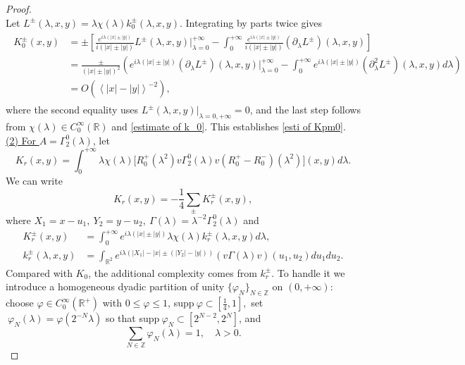 \documentclass[10pt,a4paper]{amsart}
\newcommand\R{\mathbb{R}}
\newcommand\Z{\mathbb{Z}}
\begin{document}
\begin{proof}
\begin{equation}
\end{equation} 
Let $L^{\pm}(\lambda,x,y)=\lambda \chi(\lambda)k^{\pm}_0(\lambda,x,y)$. Integrating by parts twice gives
\begin{align}\label{inte parts twice of Kpm0}
\begin{split}
K^{\pm}_{0}(x,y)&=\pm\left[\frac{e^{i\lambda(|x|\pm |y|)}}{i(|x|\pm |y|)}L^{\pm}(\lambda,x,y)\Big|^{+\infty}_{\lambda=0}-\int_{0}^{+\infty}\frac{e^{i\lambda(|x|\pm |y|)}}{i(|x|\pm |y|)}(\partial_{\lambda}L^{\pm})(\lambda,x,y)\right]\\
&=\frac{\pm}{(|x|\pm |y|)^2}\left(e^{i\lambda(|x|\pm |y|)}(\partial_{\lambda}L^{\pm})(\lambda,x,y)\Big|^{+\infty}_{\lambda=0}-\int_{0}^{+\infty}e^{i\lambda(|x|\pm |y|)}(\partial^2_{\lambda}L^{\pm})(\lambda,x,y
)d\lambda\right)\\
&=O(\left<|x|-|y|\right>^{-2}),
\end{split}
\end{align}
where the second equality uses $L^{\pm}(\lambda,x,y)\big|_{\lambda=0,+\infty}=0$, and the last step follows from $\chi(\lambda)\in C^{\infty}_0(\R)$ and \eqref{estimate of k_0}.
This establishes \eqref{esti of Kpm0}.
\vskip0.3cm
\underline{(2) For $A=\Gamma^0_2(\lambda)$}, let 
\begin{equation*}
K_r(x,y)=\int_{0}^{+\infty}\lambda\chi(\lambda)\big[R^+_0(\lambda^{2})v\Gamma^0_2(\lambda)v(R^+_0-R^-_0)(\lambda^{2})\big](x,y)d\lambda.
\end{equation*}
We can write
\begin{equation*}
    K_r(x,y)=-\frac{1}{4}\sum\limits_{\pm}K^{\pm}_r(x,y),
\end{equation*}
where $X_1=x-u_1,\ Y_2=y-u_2,\ {\Gamma}(\lambda)=\lambda^{-2}\Gamma^0_2(\lambda)$ and 
\begin{align*}
K^{\pm}_r(x,y)&=\int_{0}^{+\infty}e^{i\lambda(|x|\pm|y|)}\lambda\chi(\lambda)k^{\pm}_r(\lambda,x,y)d\lambda,\\
k^{\pm}_r(\lambda,x,y)&=\int_{\R^2}e^{i\lambda(|X_1|-|x|\pm (|Y_2|-|y|))}(v\Gamma(\lambda)v)(u_1,u_2)du_1du_2.
\end{align*}
\indent Compared with $K_0$, the additional complexity comes from $k^{\pm}_r$. To handle it we introduce a homogeneous dyadic partition of unity $\{{\varphi_{N}}\}_{N\in \Z}$ on $(0,+\infty)$: choose $\varphi\in C^{\infty}_{0}(\R^{+})$ with $0\leq\varphi\leq1$, supp$~\varphi\subset[\frac{1}{4},1],$ set $\ \varphi_{N}(\lambda)=\varphi(2^{-N}\lambda)$ so that supp$~\varphi_{N}\subset[2^{N-2},2^{N}]$, and $$ \sum_{N\in\Z}{}\varphi_{N}(\lambda)=1,  \quad\lambda>0.$$

\end{proof}
\end{document}
